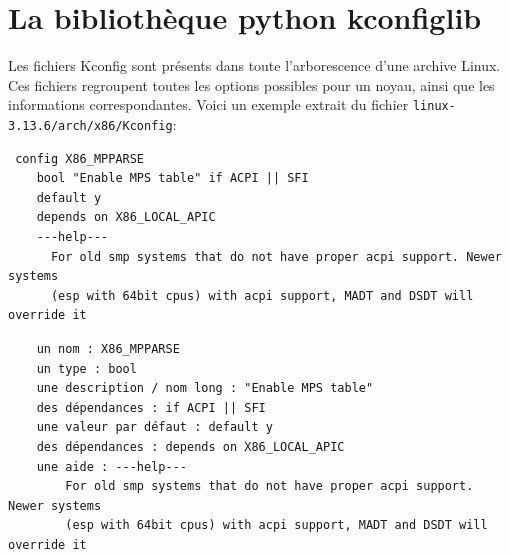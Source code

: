 ﻿\documentclass[17pts]{report}
\begin{document}
\section{La bibliothèque python kconfiglib}
\label{sec:La bibliothèque python kconfiglib}

Les fichiers Kconfig sont présents dans toute l'arborescence d'une archive
Linux.  Ces fichiers regroupent toutes les options possibles pour un noyau,
ainsi que les informations correspondantes.  Voici un exemple extrait du
fichier \verb|linux-3.13.6/arch/x86/Kconfig|:
\begin{verbatim}
 config X86_MPPARSE
    bool "Enable MPS table" if ACPI || SFI
    default y
    depends on X86_LOCAL_APIC
    ---help---
      For old smp systems that do not have proper acpi support. Newer systems
      (esp with 64bit cpus) with acpi support, MADT and DSDT will override it
\end{verbatim}
\begin{verbatim}
    un nom : X86_MPPARSE
    un type : bool
    une description / nom long : "Enable MPS table"
    des dépendances : if ACPI || SFI
    une valeur par défaut : default y
    des dépendances : depends on X86_LOCAL_APIC
    une aide : ---help---
        For old smp systems that do not have proper acpi support. Newer systems
        (esp with 64bit cpus) with acpi support, MADT and DSDT will override it
\end{verbatim}
\end{document}
